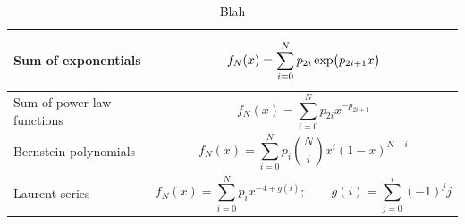 \begin{table}[htb]
    \caption[Function families considered in the discrete profiling method]{Blah}
    \label{tab:discrete_functions}
    \vspace{.5cm}
    \centering
    \footnotesize
    \renewcommand{\arraystretch}{1}
    \begin{tabular}{m{}|p{}}
       Sum of exponentials & 
       \begin{equation*}
           f_N(x) = \sum^N_{i=0} p_{2i}\,{\rm{exp}}\big( p_{2i+1}x\big)
       \end{equation*} \\ \hline
       Sum of power law functions & 
       \begin{equation*}
           f_N(x) = \sum^N_{i=0} p_{2i}x^{-p_{2i+1}}
       \end{equation*} \\ \hline
       Bernstein polynomials & 
       \begin{equation*}
           f_N(x) = \sum^N_{i=0} p_i {N \choose i}x^i(1-x)^{N-i}
       \end{equation*} \\ \hline
       Laurent series &
       \begin{equation*}
           f_N(x) = \sum^N_{i=0} p_i x^{-4+g(i)}; \qquad g(i) = \sum^i_{j=0} (-1)^jj
       \end{equation*} \\      
    \end{tabular}
\end{table}

